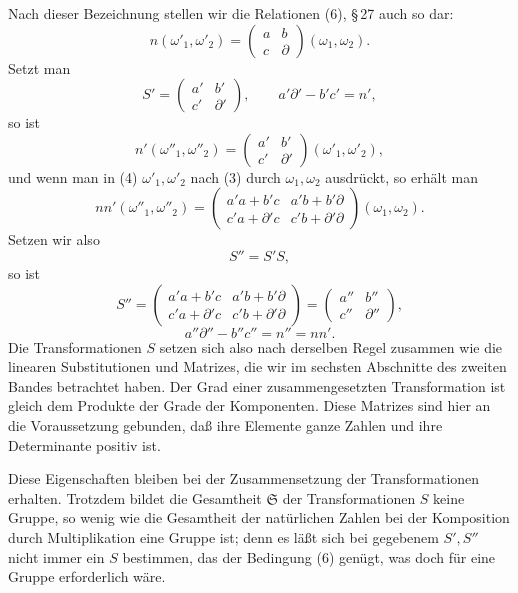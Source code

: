 \documentclass[11pt]{article}
\begin{document}
Nach dieser Bezeichnung stellen wir die Relationen (6), \S\,27 auch so dar:
\begin{equation}
n(\omega'_1,\omega'_2)=\begin{pmatrix}a&b\\ c&\partial\end{pmatrix}(\omega_1,\omega_2). \tag{3}
\end{equation}
Setzt man
\[
S'=\begin{pmatrix}a'&b'\\ c'&\partial'\end{pmatrix},
\qquad a'\partial'-b'c'=n',
\]
so ist
\begin{equation}
n'(\omega''_1,\omega''_2)=\begin{pmatrix}a'&b'\\ c'&\partial'\end{pmatrix}(\omega'_1,\omega'_2), \tag{4}
\end{equation}
und wenn man in (4) $\omega'_1,\omega'_2$ nach (3) durch $\omega_1,\omega_2$ ausdrückt, so erhält man
\begin{equation}
 nn'(\omega''_1,\omega''_2)
 =\begin{pmatrix}a'a+b'c&a'b+b'\partial\\ c'a+\partial'c&c'b+\partial'\partial\end{pmatrix}(\omega_1,\omega_2). \tag{5}
\end{equation}
Setzen wir also
\begin{equation}
S''=S'S, \tag{6}
\end{equation}
so ist
\[
S''=\begin{pmatrix}a'a+b'c&a'b+b'\partial\\ c'a+\partial'c&c'b+\partial'\partial\end{pmatrix}
=\begin{pmatrix}a''&b''\\ c''&\partial''\end{pmatrix},
\]
\[
a''\partial''-b''c''=n''=nn'.
\]
Die Transformationen $S$ setzen sich also nach derselben Regel zusammen wie die linearen Substitutionen und Matrizes, die wir im sechsten Abschnitte des zweiten Bandes betrachtet haben. Der Grad einer zusammengesetzten Transformation ist gleich dem Produkte der Grade der Komponenten. Diese Matrizes sind hier an die Voraussetzung gebunden, daß ihre Elemente ganze Zahlen und ihre Determinante positiv ist.

Diese Eigenschaften bleiben bei der Zusammensetzung der Transformationen erhalten. Trotzdem bildet die Gesamtheit $\mathfrak S$ der Transformationen $S$ keine Gruppe, so wenig wie die Gesamtheit der natürlichen Zahlen bei der Komposition durch Multiplikation eine Gruppe ist; denn es läßt sich bei gegebenem $S',S''$ nicht immer ein $S$ bestimmen, das der Bedingung (6) genügt, was doch für eine Gruppe erforderlich wäre.
\end{document}
